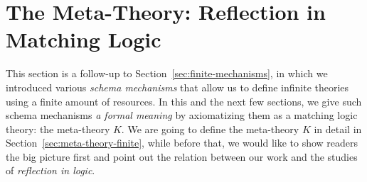 \documentclass[UTF8,11pt]{article}
\theoremstyle{plain}
\theoremstyle{definition}
\theoremstyle{remark}
\begin{document}
\section{The Meta-Theory: Reflection in Matching Logic}
This section is a follow-up to Section~\cref{sec:finite-mechanisms}, in which 
we introduced various \emph{schema mechanisms} that allow us to define infinite 
theories using a finite amount of resources.
In this and the next few sections, we give such schema mechanisms \emph{a 
formal meaning} by axiomatizing them as a matching logic theory: the 
meta-theory $K$.
We are going to define the meta-theory $K$ in detail in 
Section~\cref{sec:meta-theory-finite}, while before that, we would like to show 
readers the big picture first and point out the relation between our work and 
the studies of \emph{reflection in logic}.



%
%
\end{document}
